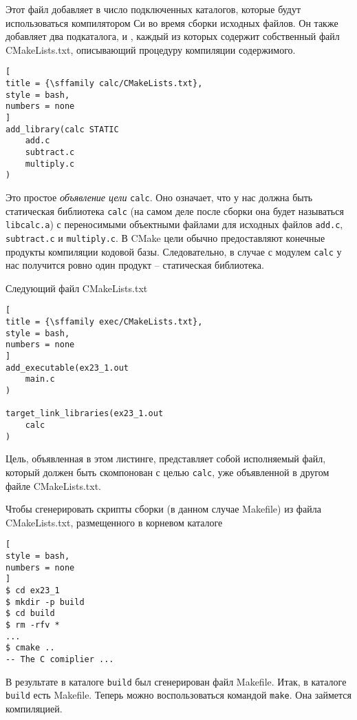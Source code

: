\documentclass[%
	11pt,
	a4paper,
	utf8,
		]{article}
\begin{document}
Этот файл добавляет  в число подключенных каталогов, которые будут использоваться компилятором Си во время сборки исходных файлов. Он также добавляет два подкаталога,  и , каждый из которых содержит собственный файл CMakeLists.txt, описывающий процедуру компиляции содержимого.

\begin{lstlisting}[
title = {\sffamily calc/CMakeLists.txt},
style = bash,
numbers = none
]
add_library(calc STATIC
    add.c
    subtract.c
    multiply.c
)
\end{lstlisting}

Это простое \emph{объявление цели} \verb|calc|. Оно означает, что у нас должна быть статическая библиотека \verb|calc| (на самом деле после сборки она будет называться \verb|libcalc.a|) с переносимыми объектными файлами для исходных файлов \verb|add.c|, \verb|subtract.c| и \verb|multiply.c|. В CMake цели обычно предоставляют конечные продукты компиляции кодовой базы. Следовательно, в случае с модулем \verb|calc| у нас получится ровно один продукт -- статическая библиотека.

Следующий файл CMakeLists.txt
\begin{lstlisting}[
title = {\sffamily exec/CMakeLists.txt},
style = bash,
numbers = none
]
add_executable(ex23_1.out
    main.c
)

target_link_libraries(ex23_1.out
    calc
)
\end{lstlisting}

Цель, объявленная в этом листинге, представляет собой исполняемый файл, который должен быть скомпонован с целью \verb|calc|, уже объявленной в другом файле CMakeLists.txt.

Чтобы сгенерировать скрипты сборки (в данном случае Makefile) из файла CMakeLists.txt, размещенного в корневом каталоге
\begin{lstlisting}[
style = bash,
numbers = none
]
$ cd ex23_1
$ mkdir -p build
$ cd build
$ rm -rfv *
...
$ cmake ..
-- The C comiplier ...
\end{lstlisting}

В результате в каталоге \verb|build| был сгенерирован файл Makefile. Итак, в каталоге \verb|build| есть Makefile. Теперь можно воспользоваться командой \verb|make|. Она займется компиляцией.
\end{document}

